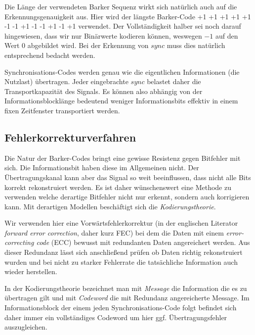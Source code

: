 Die Länge der verwendeten Barker Sequenz wirkt sich natürlich auch auf die Erkennungsgenauigkeit aus. Hier wird der längste Barker-Code \textsf{+1 +1 +1 +1 +1 -1 -1 +1 -1 -1 +1 -1 +1} verwendet. Der Vollständigkeit halber sei noch darauf hingewiesen, dass wir nur Binärwerte kodieren können, weswegen $-1$ auf den Wert $0$ abgebildet wird. Bei der Erkennung von $sync$ muss dies natürlich entsprechend bedacht werden.

Synchronisations-Codes werden genau wie die eigentlichen Informationen (die \glqq{}Nutzlast\grqq{}) übertragen. Jeder eingebrachte $sync$ belastet daher die Transportkapazität des Signals. Es können also abhängig von der Informationsblocklänge bedeutend weniger Informationsbits effektiv in einem fixen Zeitfenster transportiert werden. 


\pagebreak

\subsection{Fehlerkorrekturverfahren} 
\label{sec:errorcorrection}

Die Natur der Barker-Codes bringt eine gewisse Resistenz gegen Bitfehler mit sich. Die Informationsbit haben diese im Allgemeinen nicht. Der Übertragungskanal kann aber das Signal so weit beeinflussen, dass nicht alle Bits korrekt rekonstruiert werden. Es ist daher wünschenswert eine Methode zu verwenden welche derartige Bitfehler nicht nur erkennt, sondern auch korrigieren kann. Mit derartigen Modellen beschäftigt sich die \textit{Kodierungstheorie}.

Wir verwenden hier eine Vorwärtsfehlerkorrektur (in der englischen Literator \textit{forward error correction}, daher kurz FEC) bei dem die Daten mit einem \textit{error-correcting code}  (ECC) bewusst mit redundanten Daten angereichert werden. Aus dieser Redundanz lässt sich anschließend prüfen ob Daten richtig rekonstruiert wurden und bei nicht zu starker Fehlerrate die tatsächliche Information auch wieder herstellen. 

In der Kodierungstheorie bezeichnet man mit \textit{Message} die Information die es zu übertragen gilt und mit \textit{Codeword} die mit Redundanz angereicherte Message. Im Informationsblock der einem jeden Synchronisations-Code folgt befindet sich daher immer ein vollständiges Codeword um hier ggf. Übertragungsfehler auszugleichen. 


